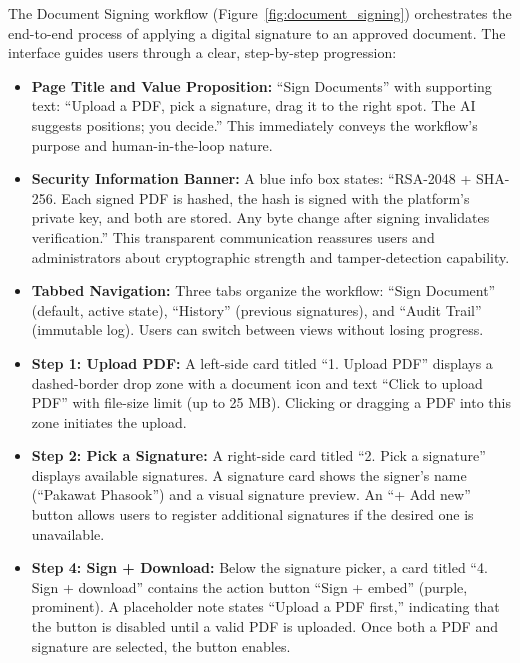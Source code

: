 \documentclass[12pt,oneside,openright,a4paper]{cpe-english-project}
\begin{document}
The Document Signing workflow (Figure~\ref{fig:document_signing}) orchestrates the end-to-end process of applying a digital signature to an approved document. The interface guides users through a clear, step-by-step progression:

\begin{itemize}
\item \textbf{Page Title and Value Proposition:} ``Sign Documents'' with supporting text: ``Upload a PDF, pick a signature, drag it to the right spot. The AI suggests positions; you decide.'' This immediately conveys the workflow's purpose and human-in-the-loop nature.

\item \textbf{Security Information Banner:} A blue info box states: ``RSA-2048 + SHA-256. Each signed PDF is hashed, the hash is signed with the platform's private key, and both are stored. Any byte change after signing invalidates verification.'' This transparent communication reassures users and administrators about cryptographic strength and tamper-detection capability.

\item \textbf{Tabbed Navigation:} Three tabs organize the workflow: ``Sign Document'' (default, active state), ``History'' (previous signatures), and ``Audit Trail'' (immutable log). Users can switch between views without losing progress.

\item \textbf{Step 1: Upload PDF:} A left-side card titled ``1. Upload PDF'' displays a dashed-border drop zone with a document icon and text ``Click to upload PDF'' with file-size limit (up to 25 MB). Clicking or dragging a PDF into this zone initiates the upload.

\item \textbf{Step 2: Pick a Signature:} A right-side card titled ``2. Pick a signature'' displays available signatures. A signature card shows the signer's name (``Pakawat Phasook'') and a visual signature preview. An ``+ Add new'' button allows users to register additional signatures if the desired one is unavailable.

\item \textbf{Step 4: Sign + Download:} Below the signature picker, a card titled ``4. Sign + download'' contains the action button ``Sign + embed'' (purple, prominent). A placeholder note states ``Upload a PDF first,'' indicating that the button is disabled until a valid PDF is uploaded. Once both a PDF and signature are selected, the button enables.


\end{itemize}
\end{document}
